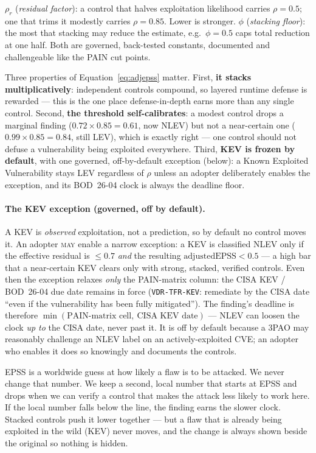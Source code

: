 \documentclass[11pt]{article}
\newcommand{\code}[1]{\texttt{#1}}
\newcommand{\rfckw}[1]{\textsc{#1}}
\begin{document}
\begin{definitionbox}
$\rho_r$ (\emph{residual factor}): a control that halves exploitation likelihood
carries $\rho=0.5$; one that trims it modestly carries $\rho=0.85$. Lower is
stronger. $\phi$ (\emph{stacking floor}): the most that stacking may reduce the
estimate, e.g.\ $\phi=0.5$ caps total reduction at one half. Both are governed,
back-tested constants, documented and challengeable like the PAIN cut points.
\end{definitionbox}

Three properties of Equation~\eqref{eq:adjepss} matter. First, \textbf{it stacks
multiplicatively}: independent controls compound, so layered runtime defense is
rewarded --- this is the one place defense-in-depth earns more than any single
control. Second, \textbf{the threshold self-calibrates}: a modest control drops a
marginal finding ($0.72\times0.85=0.61$, now NLEV) but not a near-certain one
($0.99\times0.85=0.84$, still LEV), which is exactly right --- one control should
not defuse a vulnerability being exploited everywhere. Third,
\textbf{KEV is frozen by default}, with one governed, off-by-default exception
(below): a Known Exploited Vulnerability stays LEV regardless of $\rho$ unless an
adopter deliberately enables the exception, and its BOD~26-04 clock is always the
deadline floor.

\paragraph{The KEV exception (governed, off by default).} A KEV is
\emph{observed} exploitation, not a prediction, so by default no control moves it.
An adopter \rfckw{may} enable a narrow exception: a KEV is classified NLEV only if
the effective residual is $\le 0.7$ \emph{and} the resulting $\mathrm{adjustedEPSS}
< 0.5$ --- a high bar that a near-certain KEV clears only with strong, stacked,
verified controls. Even then the exception relaxes \emph{only} the PAIN-matrix
column: the CISA KEV / BOD~26-04 due date remains in force (\code{VDR-TFR-KEV}:
remediate by the CISA date ``even if the vulnerability has been fully
mitigated''). The finding's deadline is therefore
$\min(\text{PAIN-matrix cell},\ \text{CISA KEV date})$ --- NLEV can loosen the
clock \emph{up to} the CISA date, never past it. It is off by default because a
3PAO may reasonably challenge an NLEV label on an actively-exploited CVE; an
adopter who enables it does so knowingly and documents the controls.

\begin{plain}
EPSS is a worldwide guess at how likely a flaw is to be attacked. We never change
that number. We keep a second, local number that starts at EPSS and drops when we
can verify a control that makes the attack less likely to work here. If the local
number falls below the line, the finding earns the slower clock. Stacked controls
push it lower together --- but a flaw that is already being exploited in the wild
(KEV) never moves, and the change is always shown beside the original so nothing
is hidden.
\end{plain}
\end{document}
